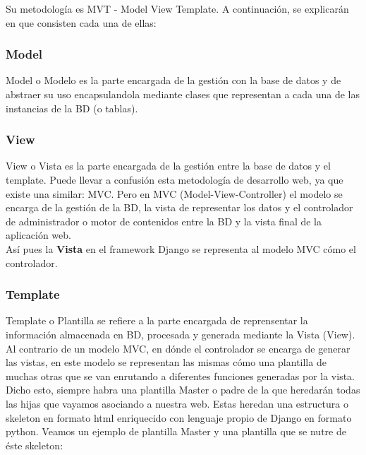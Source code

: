 Su metodología es MVT - Model View Template. A continuación, se explicarán en que consisten cada una de ellas:

\subsubsection{Model}

Model o Modelo es la parte encargada de la gestión con la base de datos y de abstraer su uso encapsulandola mediante clases que representan a cada una de las instancias de la BD (o tablas).\\

\subsubsection{View}

View o Vista es la parte encargada de la gestión entre la base de datos y el template. Puede llevar a confusión esta metodología de desarrollo web, ya que existe una similar: MVC. Pero en MVC (Model-View-Controller) el modelo se encarga de la gestión de la BD, la vista de representar los datos y el controlador de administrador o motor de contenidos entre la BD y la vista final de la aplicación web. \\

Así pues la \textbf{Vista} en el framework Django se representa al modelo MVC cómo el controlador.\\

\subsubsection{Template}

Template o Plantilla se refiere a la parte encargada de reprensentar la información almacenada en BD, procesada y generada mediante la Vista (View). Al contrario de un modelo MVC, en dónde el controlador se encarga de generar las vistas, en este modelo se representan las mismas cómo una plantilla de muchas otras que se van enrutando a diferentes funciones generadas por la vista. \\

Dicho esto, siempre habra una plantilla Master o padre de la que heredarán todas las hijas que vayamos asociando a nuestra web. Estas heredan una estructura o skeleton en formato html enriquecido con lenguaje propio de Django en formato python. Veamos un ejemplo de plantilla Master y una plantilla que se nutre de éste skeleton:\\

